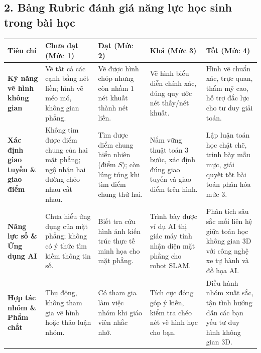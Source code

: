 \documentclass[12pt, a4paper]{article}
\begin{document}
\subsection*{2. Bảng Rubric đánh giá năng lực học sinh trong bài học}

\begin{center}
\small
\begin{tabularx}{\textwidth}{|p{2.8cm}|X|X|X|X|}
\hline
\textbf{Tiêu chí} & \textbf{Chưa đạt (Mức 1)} & \textbf{Đạt (Mức 2)} & \textbf{Khá (Mức 3)} & \textbf{Tốt (Mức 4)} \\ \hline
\textbf{Kỹ năng vẽ hình không gian} & Vẽ tất cả các cạnh bằng nét liền; hình vẽ méo mó, không gian phẳng. & Vẽ được hình chóp nhưng còn nhầm $1$ nét khuất thành nét liền. & Vẽ hình biểu diễn chính xác, đúng quy ước nét thấy/nét khuất. & Hình vẽ chuẩn xác, trực quan, thẩm mỹ cao, hỗ trợ đắc lực cho tư duy giải toán. \\ \hline
\textbf{Xác định giao tuyến \& giao điểm} & Không tìm được điểm chung của hai mặt phẳng; ngộ nhận hai đường chéo nhau cắt nhau. & Tìm được điểm chung hiển nhiên (điểm $S$); còn lúng túng khi tìm điểm chung thứ hai. & Nắm vững thuật toán 3 bước, xác định đúng giao tuyến và giao điểm trên hình. & Lập luận toán học chặt chẽ, trình bày mẫu mực, giải quyết tốt bài toán phân hóa mức 3. \\ \hline
\textbf{Năng lực số \& Ứng dụng AI} & Chưa hiểu ứng dụng của mặt phẳng; không có ý thức tìm kiếm thông tin số. & Biết tra cứu hình ảnh kiến trúc thực tế minh họa cho mặt phẳng. & Trình bày được ví dụ AI thị giác máy tính nhận diện mặt phẳng cho robot SLAM. & Phân tích sâu sắc mối liên hệ giữa toán học không gian 3D với công nghệ xe tự hành và đồ họa AI. \\ \hline
\textbf{Hợp tác nhóm \& Phẩm chất} & Thụ động, không tham gia vẽ hình hoặc thảo luận nhóm. & Có tham gia làm việc nhóm khi giáo viên nhắc nhở. & Tích cực đóng góp ý kiến, kiểm tra chéo nét vẽ hình học cho bạn. & Điều hành nhóm xuất sắc, tận tình hướng dẫn các bạn yếu tư duy hình không gian 3D. \\ \hline
\end{tabularx}
\end{center}
\end{document}
